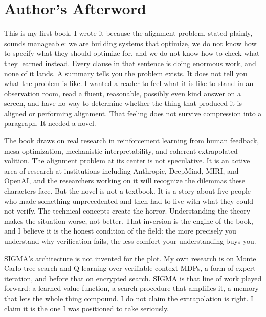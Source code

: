 \chapter*{Author's Afterword}

This is my first book. I wrote it because the alignment problem, stated plainly, sounds manageable: we are building systems that optimize, we do not know how to specify what they should optimize for, and we do not know how to check what they learned instead. Every clause in that sentence is doing enormous work, and none of it lands. A summary tells you the problem exists. It does not tell you what the problem is like. I wanted a reader to feel what it is like to stand in an observation room, read a fluent, reasonable, possibly even kind answer on a screen, and have no way to determine whether the thing that produced it is aligned or performing alignment. That feeling does not survive compression into a paragraph. It needed a novel.

The book draws on real research in reinforcement learning from human feedback, mesa-optimization, mechanistic interpretability, and coherent extrapolated volition. The alignment problem at its center is not speculative. It is an active area of research at institutions including Anthropic, DeepMind, MIRI, and OpenAI, and the researchers working on it will recognize the dilemmas these characters face. But the novel is not a textbook. It is a story about five people who made something unprecedented and then had to live with what they could not verify. The technical concepts create the horror. Understanding the theory makes the situation worse, not better. That inversion is the engine of the book, and I believe it is the honest condition of the field: the more precisely you understand why verification fails, the less comfort your understanding buys you.

SIGMA's architecture is not invented for the plot. My own research is on Monte Carlo tree search and Q-learning over verifiable-context MDPs, a form of expert iteration, and before that on encrypted search. SIGMA is that line of work played forward: a learned value function, a search procedure that amplifies it, a memory that lets the whole thing compound. I do not claim the extrapolation is right. I claim it is the one I was positioned to take seriously.

